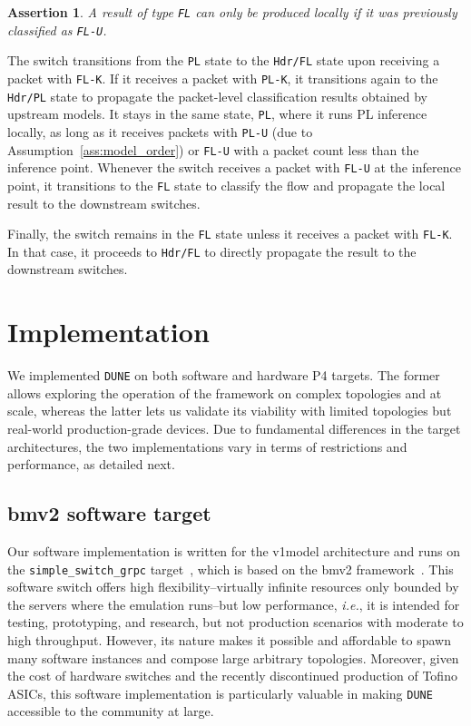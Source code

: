 \documentclass[journal]{IEEEtran}
\theoremstyle{plain} %
\newtheorem{assertion}{Assertion}
\newcommand{\ie}{\textit{i.e.},\xspace}
\newcommand{\name}{\texttt{\fontsize{9}{11}\selectfont DUNE}\xspace}
\begin{document}
\begin{assertion}
A result of type \texttt{FL} can only be produced locally if it was previously classified as \texttt{FL-U}.
\label{assr:fl_inference}
\end{assertion}

The switch transitions from the \texttt{PL} state to the \texttt{Hdr/FL} state upon receiving a packet with \texttt{FL-K}. If it receives a packet with \texttt{PL-K}, it transitions again to the \texttt{Hdr/PL} state to propagate the packet-level classification results obtained by upstream models. It stays in the same state, \texttt{PL}, where it runs PL inference locally, as long as it receives packets with \texttt{PL-U} (due to Assumption~\ref{ass:model_order}) or \texttt{FL-U} with a packet count less than the inference point. Whenever the switch receives a packet with \texttt{FL-U} at the inference point, it transitions to the \texttt{FL} state to classify the flow and propagate the local result to the downstream switches.

Finally, the switch remains in the \texttt{FL} state unless it receives a packet with \texttt{FL-K}. In that case, it proceeds to \texttt{Hdr/FL} to directly propagate the result to the downstream switches.

\section{Implementation}
\label{sec:implementation}

We implemented \name on both software and hardware P4 targets. The former allows exploring the operation of the framework on complex topologies and at scale, whereas the latter lets us validate its viability with limited topologies but real-world production-grade devices. Due to fundamental differences in the target architectures, the two implementations vary in terms of restrictions and performance, as detailed next.

\subsection{bmv2 software target}
\label{sub:software}

Our software implementation is written for the v1model architecture and runs on the \texttt{simple\_switch\_grpc} target~\cite{simple_switch}, which is based on the bmv2 framework~\cite{bmv2}.
This software switch offers high flexibility--virtually infinite resources only bounded by the servers where the emulation runs--but low performance, \ie it is intended for testing, prototyping, and research, but not production scenarios with moderate to high throughput.
However, its nature makes it possible and affordable to spawn many software instances and compose large arbitrary topologies.
Moreover, given the cost of hardware switches and the recently discontinued production of Tofino ASICs, this software implementation is particularly valuable in making \name accessible to the community at large.
\end{document}
